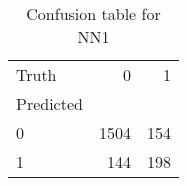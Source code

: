 \begin{table}[h!]
\caption{Confusion table for NN1}
\label{tab:NN1}
\begin{tabular}{lrr}
\toprule
Truth & 0 & 1 \\
Predicted &  &  \\
\midrule
0 & 1504 & 154 \\
1 & 144 & 198 \\
\bottomrule
\end{tabular}
\end{table}
